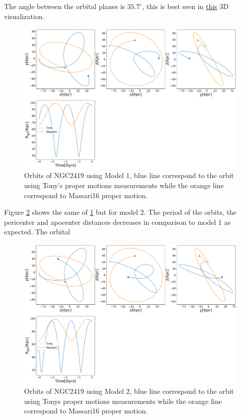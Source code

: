 \documentclass[14pt]{article}
\begin{document}
The angle between the orbital planes is $35.7^{\circ}$, this is best seen in
\href{https://plot.ly/~jngc/3/orbits/?share_key=FcyuVOnd0LYVXaYhGmSuo9}{this}
3D visualization.


\begin{figure}[H]
\centering
\includegraphics[scale=0.3]{../exploratory_code/NGC2419_sphMW.pdf}
\caption{Orbits of NGC2419 using Model 1, blue line correspond to
the orbit using Tony's proper motions measurements while the orange line correspond to
Massari16 proper motion.\label{fig:model1MW}}
\end{figure}

Figure \ref{fig:model2MW} shows the same of \ref{fig:model1MW} but for
model 2. The period of the orbits, the pericenter and apocenter
distances decreases in comparison to model 1 as expected. The orbital 


\begin{figure}[H]
\centering
\includegraphics[scale=0.3]{../exploratory_code/NGC2419_sphMW_h.pdf}
\caption{Orbits of NGC2419 using Model 2, blue line correspond to
the orbit using Tonys proper motions measurements while the orange line correspond to
Massari16 proper motion.\label{fig:model2MW}}
\end{figure}
\end{document}
